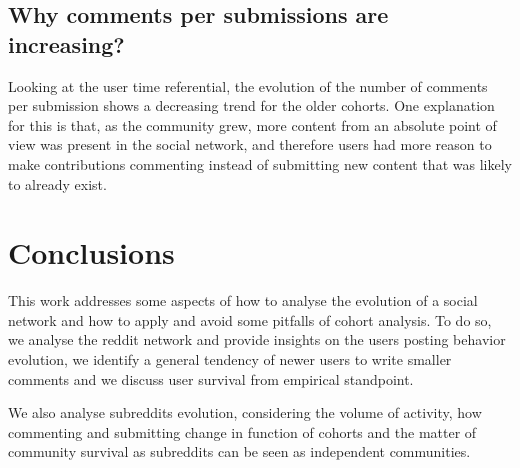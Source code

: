 \subsection{Why comments per submissions are increasing?}

Looking at the user time referential, the evolution of the number of comments per submission shows a decreasing trend for the older cohorts. One explanation for this is that, as the community grew, more content from an absolute point of view was present in the social network, and therefore users had more reason to make contributions commenting instead of submitting new content that was likely to already exist.

\section{Conclusions}

This work addresses some aspects of how to analyse the evolution of a social network and how to apply and avoid some pitfalls of cohort analysis. To do so, we analyse the reddit network and provide insights on the users posting behavior evolution, we identify a general tendency of newer users to write smaller comments and we discuss user survival from empirical standpoint. 

We also analyse subreddits evolution, considering the volume of activity, how commenting and submitting change in function of cohorts and the matter of community survival as subreddits can be seen as independent communities.
